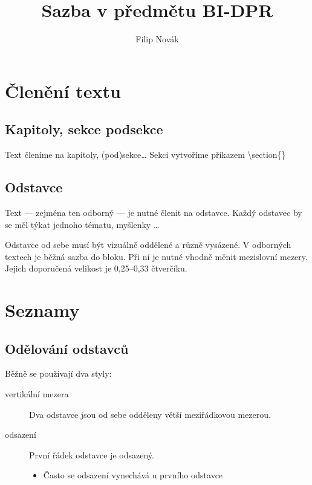 \documentclass{article}
\title{Sazba v předmětu BI-DPR}
\author{Filip Novák}
\begin{document}
\maketitle

\tableofcontents
\listoftables
\listoffigures

\clearpage
\section{Členění textu}

\subsection[Kapitoly]{Kapitoly, sekce podsekce}
Text členíme na kapitoly, (pod)sekce\dots{} Sekci vytvoříme příkazem
\textbackslash section\{\}
\subsection{Odstavce}
Text --- zejména ten odborný --- je nutné členit na odstavce. Každý
odstavec by se měl týkat jednoho tématu, myšlenky \dots

Odstavce od sebe musí být vizuálně oddělené a různě vysázené. V
odborných textech je běžná sazba do bloku. Při ní je nutné vhodně měnit
mezislovní mezery. Jejich doporučená velikost je 0,25--0,33 čtverčíku.
\section{Seznamy}
\subsection{Odělování odstavců}

Běžně se používají dva styly:

\begin{description}
     \item[vertikální mezera] Dva odstavce jsou od sebe odděleny větší
meziřádkovou mezerou.
     \item[odsazení] První řádek odstavce je odsazený.
     \begin{itemize}
         \item Často se odsazení vynechává u prvního odstavce
     \end{itemize}
\end{description}
\end{document}
